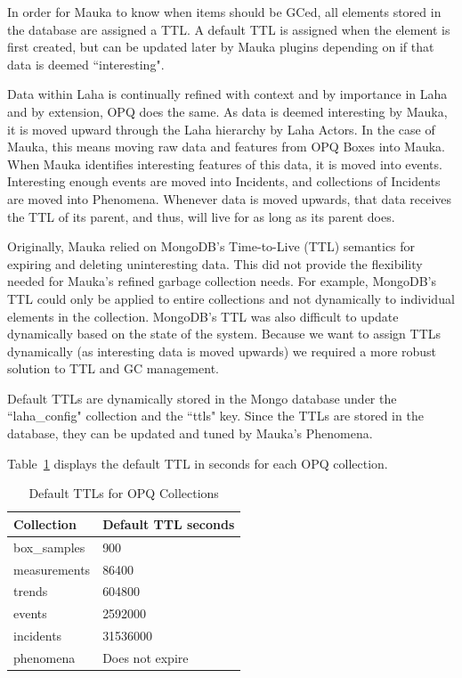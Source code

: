 In order for Mauka to know when items should be GCed, all elements stored in the database are assigned a TTL. A default TTL is assigned when the element is first created, but can be updated later by Mauka plugins depending on if that data is deemed ``interesting".

Data within Laha is continually refined with context and by importance in Laha and by extension, OPQ does the same. As data is deemed interesting by Mauka, it is moved upward through the Laha hierarchy by Laha Actors. In the case of Mauka, this means moving raw data and features from OPQ Boxes into Mauka. When Mauka identifies interesting features of this data, it is moved into events. Interesting enough events are moved into Incidents, and collections of Incidents are moved into Phenomena. Whenever data is moved upwards, that data receives the TTL of its parent, and thus, will live for as long as its parent does.

Originally, Mauka relied on MongoDB's Time-to-Live (TTL) semantics for expiring and deleting uninteresting data. This did not provide the flexibility needed for Mauka's refined garbage collection needs. For example, MongoDB's TTL could only be applied to entire collections and not dynamically to individual elements in the collection. MongoDB's TTL was also difficult to update dynamically based on the state of the system. Because we want to assign TTLs dynamically (as interesting data is moved upwards) we required a more robust solution to TTL and GC management.

Default TTLs are dynamically stored in the Mongo database under the ``laha\_config" collection and the ``ttls" key. Since the TTLs are stored in the database, they can be updated and tuned by Mauka's Phenomena.

Table~\ref{table:DefaultTtls} displays the default TTL in seconds for each OPQ collection.

\begin{table}[H]
    \centering
    \caption{Default TTLs for OPQ Collections}
    \begin{tabularx}{\textwidth}{XX}
        \toprule
        \textbf{Collection} & \textbf{Default TTL seconds} \\
        \midrule
        box\_samples & 900 \\
        measurements & 86400 \\
        trends & 604800 \\
        events & 2592000 \\
        incidents & 31536000 \\
        phenomena & Does not expire \\
        \bottomrule
    \end{tabularx}
    \label{table:DefaultTtls}
\end{table}


